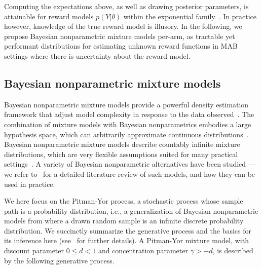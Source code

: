 \documentclass{article}
\newcommand{\ie}{i.e., }
\begin{document}
Computing the expectations above, as well as drawing posterior parameters, is attainable for reward models $p(Y|\theta)$ within the exponential family~\cite{ic-Korda2013, j-Russo2018}. In practice however, knowledge of the true reward model is illusory. In the following, we propose Bayesian nonparametric mixture models per-arm, as tractable yet performant distributions for estimating unknown reward functions in MAB settings where there is uncertainty about the reward model.

\subsection{Bayesian nonparametric mixture models}
\label{ssec:background_nonparametric_mixture_model}

Bayesian nonparametric mixture models provide a powerful density estimation framework that adjust model complexity in response to the data observed~\cite{b-Ghosal2017}. The combination of mixture models with Bayesian nonparametrics embodies a large hypothesis space, which can arbitrarily approximate continuous distributions~\cite{j-Ghosal1999, j-Ghosal2001, j-Lijoi2004, j-Ghosal2007}. Bayesian nonparametric mixture models describe countably infinite mixture distributions, which are very flexible assumptions suited for many practical settings~\cite{b-Ghosal2017}. A variety of Bayesian nonparametric alternatives have been studied --- we refer to~\citet{j-Gershman2012} for a detailed literature review of such models, and how they can be used in practice.

We here focus on the Pitman-Yor process, a stochastic process whose sample path is a probability distribution, \ie a generalization of Bayesian nonparametric models from where a drawn random sample is an infinite discrete probability distribution. We succinctly summarize the generative process and the basics for its inference here (see~\cite{j-Teh2010} for further details). A Pitman-Yor mixture model, with discount parameter $0 \leq d < 1$ and concentration parameter $\gamma > -d$, is described by the following generative process.
\end{document}
